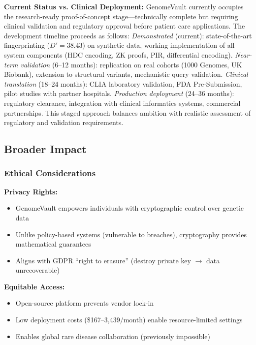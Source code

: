 \documentclass[11pt,letterpaper]{article}
\begin{document}
\textbf{Current Status vs. Clinical Deployment:} GenomeVault currently occupies the research-ready proof-of-concept stage---technically complete but requiring clinical validation and regulatory approval before patient care applications. The development timeline proceeds as follows: \textit{Demonstrated} (current): state-of-the-art fingerprinting ($D'=38.43$) on synthetic data, working implementation of all system components (HDC encoding, ZK proofs, PIR, differential encoding). \textit{Near-term validation} (6--12 months): replication on real cohorts (1000 Genomes, UK Biobank), extension to structural variants, mechanistic query validation. \textit{Clinical translation} (18--24 months): CLIA laboratory validation, FDA Pre-Submission, pilot studies with partner hospitals. \textit{Production deployment} (24--36 months): regulatory clearance, integration with clinical informatics systems, commercial partnerships. This staged approach balances ambition with realistic assessment of regulatory and validation requirements.

\subsection{Broader Impact}

\subsubsection{Ethical Considerations}

\textbf{Privacy Rights:}
\begin{itemize}
\item GenomeVault empowers individuals with cryptographic control over genetic data
\item Unlike policy-based systems (vulnerable to breaches), cryptography provides mathematical guarantees
\item Aligns with GDPR ``right to erasure'' (destroy private key $\rightarrow$ data unrecoverable)
\end{itemize}

\textbf{Equitable Access:}
\begin{itemize}
\item Open-source platform prevents vendor lock-in
\item Low deployment costs (\$167--3,439/month) enable resource-limited settings
\item Enables global rare disease collaboration (previously impossible)
\end{itemize}
\end{document}
